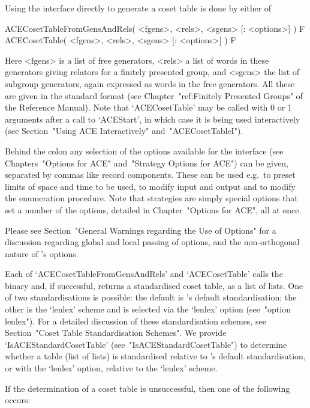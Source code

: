 \beginitems

Using the {\ACE} interface directly to generate a coset table is  done
by either of

\>ACECosetTableFromGensAndRels( <fgens>, <rels>, <sgens> [: <options>] ) F
\>ACECosetTable( <fgens>, <rels>, <sgens> [: <options>] ) F
\label{ACECosetTableNI}

Here <fgens> is a list of free generators, <rels> a list of  words  in
these generators giving relators for a finitely presented  group,  and
<sgens> the list of subgroup generators, again expressed as  words  in
the free generators. All these are given in the standard {\GAP} format
(see Chapter~"ref:Finitely Presented Groups" of the  {\GAP}  Reference
Manual). Note that `ACECosetTable' may be called with 0 or 1 arguments
after  a  call  to  `ACEStart',  in  which  case  it  is  being   used
interactively     (see     Section~"Using      ACE      Interactively"
and~"ACECosetTableI").

Behind the colon any  selection  of  the  options  available  for  the
interface (see Chapters~"Options for ACE"  and~"Strategy  Options  for
ACE") can be given, separated by commas like record components.  These
can be used e.g.~to preset limits of space and time  to  be  used,  to
modify input and output and to modify the enumeration procedure.  Note
that strategies are simply special options that set a  number  of  the
options, detailed in Chapter~"Options for ACE", all at once.

Please see Section~"General Warnings regarding the Use of Options" for
a discussion regarding global and local passing of  options,  and  the
non-orthogonal nature of {\ACE}'s options.

Each of `ACECosetTableFromGensAndRels' and `ACECosetTable'  calls  the
{\ACE} binary and, if successful, returns a standardised coset  table,
as a {\GAP} list of lists. One of two  standardisations  is  possible:
the default is {\GAP}'s default  standardisation;  the  other  is  the
`lenlex' scheme and is selected via the `lenlex'  option  (see~"option
lenlex"). For a detailed discussion of these standardisation  schemes,
see  Section~"Coset  Table  Standardisation   Schemes".   We   provide
`IsACEStandardCosetTable' (see~"IsACEStandardCosetTable") to determine
whether a table (list of lists) is standardised relative  to  {\GAP}'s
default standardisation, or with the `lenlex' option, relative to  the
`lenlex' scheme.

If the determination of a coset table is unsuccessful, then one of the
following occurs:

